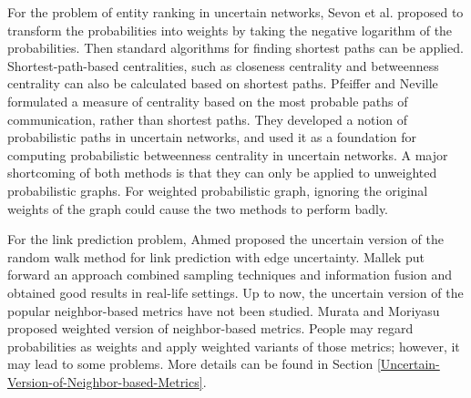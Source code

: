 \documentclass[\main/thesis.tex]{subfiles}
\begin{document}

For the problem of entity ranking in uncertain networks, Sevon et al. \cite{sevon2006link} proposed to transform the probabilities into weights by taking the negative logarithm of the probabilities. Then standard algorithms for finding shortest paths can be applied. Shortest-path-based centralities, such as closeness centrality and betweenness centrality can also be calculated based on shortest paths. Pfeiffer and Neville \cite{pfeiffer2010probabilistic} formulated a measure of centrality based on the most probable paths of communication, rather than shortest paths. They developed a notion of probabilistic paths in uncertain networks, and used it as a foundation for computing probabilistic betweenness centrality in uncertain networks. A major shortcoming of both methods is that they can only be applied to unweighted probabilistic graphs. For weighted probabilistic graph, ignoring the original weights of the graph could cause the two methods to perform badly.

For the link prediction problem, Ahmed \cite{ahmed2016efficient} proposed the uncertain version of the random walk method for link prediction with edge uncertainty. Mallek \cite{mallek2016evidential} put forward an approach combined sampling techniques and information fusion and obtained good results in real-life settings. Up to now, the uncertain version of the popular neighbor-based metrics have not been studied. Murata and Moriyasu \cite{murata2007link} proposed weighted version of neighbor-based metrics. People may regard probabilities as weights and apply weighted variants of those metrics; however, it may lead to some problems. More details can be found in Section \ref{Uncertain-Version-of-Neighbor-based-Metrics}.
\end{document}
